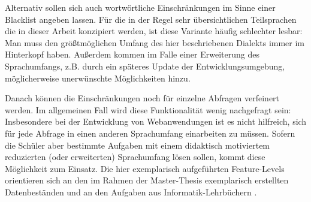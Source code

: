 Alternativ sollen sich auch wortwörtliche Einschränkungen im Sinne einer Blacklist angeben lassen. Für die in der Regel sehr übersichtlichen Teilsprachen die in dieser Arbeit konzipiert werden, ist diese Variante häufig schlechter lesbar: Man muss den größtmöglichen Umfang des hier beschriebenen Dialekts immer im Hinterkopf haben. Außerdem kommen im Falle einer Erweiterung des Sprachumfangs, z.B. durch ein späteres Update der Entwicklungsumgebung, möglicherweise unerwünschte Möglichkeiten hinzu.

Danach können die Einschränkungen noch für einzelne Abfragen verfeinert werden. Im allgemeinen Fall wird diese Funktionalität wenig nachgefragt sein: Insbesondere bei der Entwicklung von Webanwendungen ist es nicht hilfreich, sich für jede Abfrage in einen anderen Sprachumfang einarbeiten zu müssen. Sofern die Schüler aber bestimmte Aufgaben mit einem didaktisch motiviertem reduzierten (oder erweiterten) Sprachumfang lösen sollen, kommt diese Möglichkeit zum Einsatz. Die hier exemplarisch aufgeführten Feature-Levels orientieren sich an den im Rahmen der Master-Thesis exemplarisch erstellten Datenbeständen und an den Aufgaben aus Informatik-Lehrbüchern \cite{hubwieser_inf_2, grimm_informatik_2015}.


